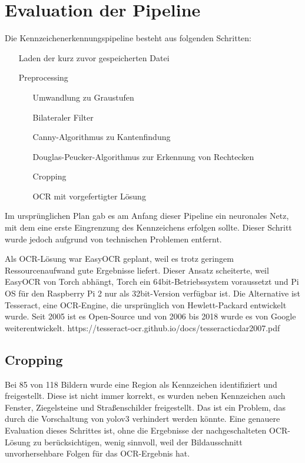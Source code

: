 \section{Evaluation der Pipeline}

Die Kennzeichenerkennungspipeline besteht aus folgenden Schritten:
\begin{itemize}
    \item[Laden der kurz zuvor gespeicherten Datei]
    \item[Preprocessing]
    \begin{itemize}
        \item[Umwandlung zu Graustufen]
        \item[Bilateraler Filter]
        \item[Canny-Algorithmus zu Kantenfindung]
        \item[Douglas-Peucker-Algorithmus zur Erkennung von Rechtecken]
        \item[Cropping]
        \item[OCR mit vorgefertigter Lösung]
    \end{itemize}
\end{itemize}

Im ursprünglichen Plan gab es am Anfang dieser Pipeline ein neuronales Netz, mit dem eine erste Eingrenzung des Kennzeichens erfolgen sollte. Dieser Schritt wurde jedoch aufgrund von technischen Problemen entfernt.

Als OCR-Lösung war EasyOCR geplant, weil es trotz geringem Ressourcenaufwand gute Ergebnisse liefert. Dieser Ansatz scheiterte, weil EasyOCR von Torch abhängt, Torch ein 64bit-Betriebssystem voraussetzt und Pi OS für den Raspberry Pi 2 nur als 32bit-Version verfügbar ist.
Die Alternative ist Tesseract, eine OCR-Engine, die ursprünglich von Hewlett-Packard entwickelt wurde. Seit 2005 ist es Open-Source und von 2006 bis 2018 wurde es von Google weiterentwickelt. https://tesseract-ocr.github.io/docs/tesseracticdar2007.pdf

\subsection{Cropping}
Bei 85 von 118 Bildern wurde eine Region als Kennzeichen identifiziert und freigestellt.
Diese ist nicht immer korrekt, es wurden neben Kennzeichen auch Fenster, Ziegelsteine und Straßenschilder freigestellt.
Das ist ein Problem, das durch die Vorschaltung von yolov3 verhindert werden könnte. 
Eine genauere Evaluation dieses Schrittes ist, ohne die Ergebnisse der nachgeschalteten OCR-Lösung zu berücksichtigen, wenig sinnvoll, weil der Bildausschnitt unvorhersehbare Folgen für das OCR-Ergebnis hat.


